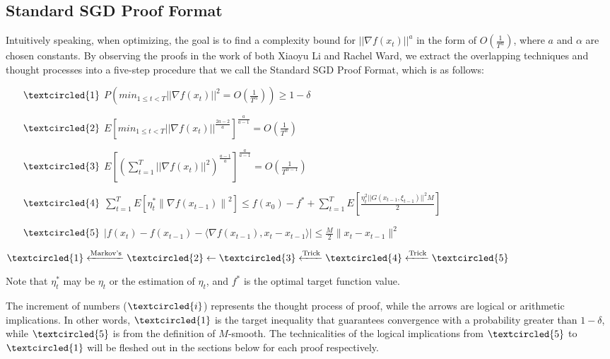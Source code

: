 \documentclass[14pt,onecolumn,letterpaper]{extarticle}
\begin{document}
\subsection{Standard SGD Proof Format}
Intuitively speaking, when optimizing, the goal is to find a complexity bound for $||\nabla f(x_t)||^a$ in the form of $O(\frac{1}{T^\alpha})$, where $a$ and $\alpha$ are chosen constants. By observing the proofs in the work of both Xiaoyu Li and Rachel Ward, we extract the overlapping techniques and thought processes into a five-step procedure that we call the Standard SGD Proof Format, which is as follows:
\begin{enumerate}
        \item [$\textcircled{1}$] $P(min_{1 \leq t < T}||\nabla f(x_t)||^2 = O(\frac{1}{T^\alpha})) \geq 1 - \delta$
        \item [$\textcircled{2}$] $E\left[min_{1 \leq t < T}||\nabla f(x_t)||^{\frac{2a-2}{a}}\right]^{\frac{a}{a-1}} = O(\frac{1}{T^{\alpha}})$
        
        \item [$\textcircled{3}$] $E\left[(\sum_{t=1}^{T}||\nabla f(x_t)||^2)^\frac{a-1}{a}\right]^{\frac{a}{a-1}} = O(\frac{1}{T^{\alpha - 1}})$
        
        \item [$\textcircled{4}$] $ \sum_{t=1}^{T}  E\left[\eta_t^*\left\|\nabla f\left(x_{t-1}\right)\right\|^2\right] \leq f\left(x_0\right)-f^*+\sum_{t=1}^{T} E\left[\frac{\eta_t^2 ||G(x_{t-1}, \xi_{t-1})||^2 M}{2}\right]$

        \item [$\textcircled{5}$] $|f(x_t)-f(x_{t-1})-\langle\nabla f(x_{t-1}), x_t-x_{t-1}\rangle| \leq \frac{M}{2}\|x_t-x_{t-1}\|^2$
\end{enumerate} \par

$\textcircled{1} \xleftarrow{\text{Markov's}} \textcircled{2} \leftarrow \textcircled{3} \xleftarrow{\text{Trick}} \textcircled{4} \xleftarrow{\text{Trick}} \textcircled{5}$\par
Note that $\eta_t^*$ may be $\eta_t$ or the estimation of $\eta_t$, and $f^*$ is the optimal target function value.\par
The increment of numbers ($\textcircled{i}$) represents the thought process of proof, while the arrows are logical or arithmetic implications. In other words, $\textcircled{1}$ is the target inequality that guarantees convergence with a probability greater than $1-\delta$, while $\textcircled{5}$ is from the definition of $M$-smooth. The technicalities of the logical implications from $\textcircled{5}$ to $\textcircled{1}$ will be fleshed out in the sections below for each proof respectively.
\end{document}

